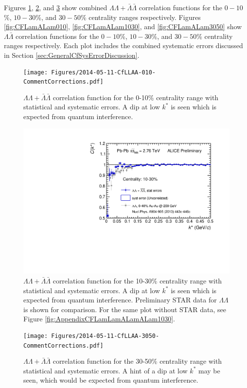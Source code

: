 Figures \ref{fig:CFLamLamALamALam010}, \ref{fig:CFLamLamALamALam1030STAR}, and \ref{fig:CFLamLamALamALam3050} show combined $\Lambda\Lambda + \bar{\Lambda}\bar{\Lambda}$ correlation functions for the $0-10$\%, $10-30$\%, and $30-50$\% centrality ranges respectively.  Figures \ref{fig:CFLamALam010}, \ref{fig:CFLamALam1030}, and \ref{fig:CFLamALam3050} show $\Lambda\bar{\Lambda}$ correlation functions for the $0-10$\%, $10-30$\%, and $30-50$\% centrality ranges respectively.  Each plot includes the combined systematic errors discussed in Section \ref{sec:GeneralCfSysErrorDiscussion}.

\begin{figure}[hbtp]
\texttt{[image: Figures/2014-05-11-CfLLAA-010-CommentCorrections.pdf]}
\caption[$\Lambda\Lambda + \bar{\Lambda}\bar{\Lambda}$ correlation function for the 0-10\% centrality range]{$\Lambda\Lambda + \bar{\Lambda}\bar{\Lambda}$ correlation function for the 0-10\% centrality range with statistical and systematic errors.  A dip at low $k^*$ is seen which is expected from quantum interference.}
\label{fig:CFLamLamALamALam010}
\end{figure}
\begin{figure}[hbtp]
\includegraphics[width=36pc]{Figures/2014-05-11-CfLLAA-1030-CommentCorrections-WithSTAR.pdf}
\caption[$\Lambda\Lambda + \bar{\Lambda}\bar{\Lambda}$ correlation function for the 10-30\% centrality range]{$\Lambda\Lambda + \bar{\Lambda}\bar{\Lambda}$ correlation function for the 10-30\% centrality range with statistical and systematic errors.  A dip at low $k^*$ is seen which is expected from quantum interference.  Preliminary STAR data for $\Lambda\Lambda$ is shown for comparison.  For the same plot without STAR data, see Figure \ref{fig:AppendixCFLamLamALamALam1030}.}
\label{fig:CFLamLamALamALam1030STAR}
\end{figure}
\begin{figure}[hbtp]
\texttt{[image: Figures/2014-05-11-CfLLAA-3050-CommentCorrections.pdf]}
\caption[$\Lambda\Lambda + \bar{\Lambda}\bar{\Lambda}$ correlation function for the 30-50\% centrality range]{$\Lambda\Lambda + \bar{\Lambda}\bar{\Lambda}$ correlation function for the 30-50\% centrality range with statistical and systematic errors.  A hint of a dip at low $k^*$ may be seen, which would be expected from quantum interference.}
\label{fig:CFLamLamALamALam3050}
\end{figure}

